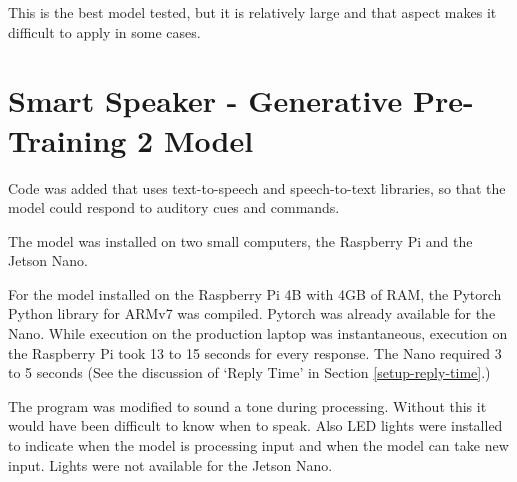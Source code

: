 This is the best model tested, but it is relatively large and that aspect makes it difficult to apply in some cases.

\section{Smart Speaker - Generative Pre-Training 2 Model}

\label{install-gpt2-smart}
Code was added that uses text-to-speech and speech-to-text libraries, so that the model could respond to auditory cues and commands.

The model was installed on two small computers, the Raspberry Pi and the Jetson Nano.%

For the model installed on the Raspberry Pi 4B with 4GB of RAM, the Pytorch Python library for ARMv7 was compiled. Pytorch was already available for the Nano. %
While execution on the production laptop was instantaneous, execution on the Raspberry Pi took 13 to 15 seconds for every response. The Nano required 3 to 5 seconds (See the discussion of `Reply Time' in Section \ref{setup-reply-time}.)

The program was modified to sound a tone during processing. Without this it would have been difficult to know when to speak. Also LED lights were installed to indicate when the model is processing input and when the model can take new input. Lights were not available for the Jetson Nano. 
